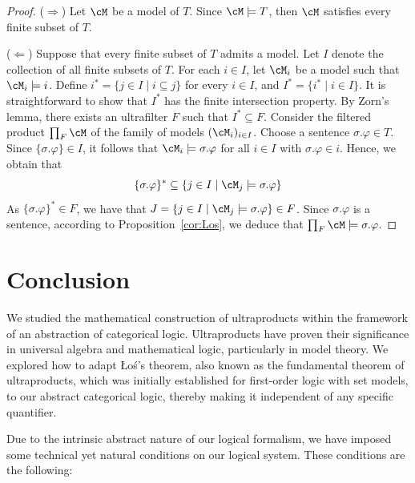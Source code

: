 \documentclass[preprint,3p,times]{elsarticle}
\newcommand{\Los}{\L{}o{\'s}}
\begin{document}
\begin{proof}
    ($\Rightarrow$) Let $\cM$ be a model of $T$. Since $\cM \models T$, then $\cM$ satisfies every finite subset of $T$.

    \medskip
    \noindent
    ($\Leftarrow$)
    Suppose that every finite subset of $T$ admits a model. Let $I$ denote the collection of all finite subsets of $T$. For each $i \in I$, let $\cM_i$ be a model such that  $\cM_i\models i$. Define $i^* = \{j \in I \mid i \subseteq j\}$ for every $i \in I$, and $I^* = \{i^* \mid i \in I\}$. It is straightforward to show that $I^*$ has the finite intersection property. By Zorn's lemma, there exists an ultrafilter $F$ such that $I^* \subseteq F$. Consider the filtered product $\prod_F \cM$ of the family of models $(\cM_i)_{i \in I}$. Choose a sentence $\sigma.\varphi \in T$. Since $\{\sigma.\varphi\} \in I$, it follows that $\cM_i \models \sigma.\varphi$ for all $i \in I$ with $\sigma.\varphi \in i$. Hence, we obtain that
    $$\{\sigma.\varphi\}^* \subseteq \{j \in I \mid \cM_j \models \sigma.\varphi\}$$
    As $\{\sigma.\varphi\}^* \in F$, we have that $J = \{j \in I \mid \cM_j\models \sigma.\varphi\} \in F$. Since $\sigma.\varphi$ is a sentence, according to Proposition~\ref{cor:Los}, we deduce that $\prod_F \cM \models \sigma.\varphi$.
\end{proof} %
\section{Conclusion}

We studied the mathematical construction of ultraproducts within the framework of an abstraction of categorical logic.
Ultraproducts have proven their significance in universal algebra and mathematical logic, particularly in model theory.
We explored how to adapt \Los's theorem, also known as the fundamental theorem of ultraproducts, which was initially established for first-order logic with set models, to our abstract categorical logic, thereby making it independent of any specific quantifier.

Due to the intrinsic abstract nature of our logical formalism, we have imposed some technical yet natural conditions on our logical system. These conditions are the following:
\end{document}
